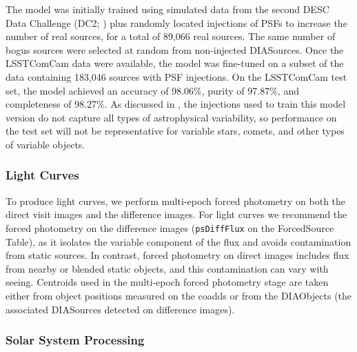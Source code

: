 The model was initially trained using simulated data from the second DESC Data Challenge (DC2; \citep{2021ApJS..253...31L}) plus randomly located injections of PSFs to increase the number of real sources, for a total of 89,066 real sources.
The same number of bogus sources were selected at random from non-injected DIASources.
Once the  \gls{LSSTComCam} data were available, the model was fine-tuned on a subset of the data containing 183,046 sources with PSF injections.
On the \gls{LSSTComCam} test set, the model achieved an accuracy of 98.06\%, purity of 97.87\%, and completeness of 98.27\%.
As discussed in , the injections used to train this model version do not capture all types of astrophysical variability, so performance on the test set will not be representative for variable stars, comets, and other types of variable objects. 


\subsubsection{Light Curves}
\label{sssec:lightcurves}
To produce light curves, we perform multi-epoch \gls{forced photometry} on both the direct visit images and the difference images.
For light curves we recommend the \gls{forced photometry} on the difference images (\texttt{psDiffFlux} on the ForcedSource Table), as it isolates the variable component of the flux and avoids contamination from static sources.
In contrast, \gls{forced photometry} on direct images includes flux from nearby or blended static objects, and this contamination can vary with seeing.
Centroids used in the multi-epoch \gls{forced photometry} stage are taken either from object positions measured on the coadds or from the DIAObjects (the associated DIASources detected on difference images).

\subsubsection{Solar System Processing}
\label{sec:drp:solsys}

